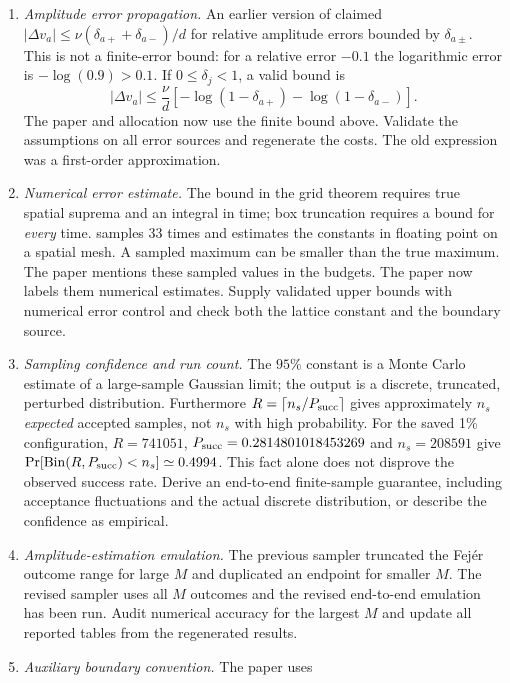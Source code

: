\documentclass[11pt,a4paper]{article}
\begin{document}
\begin{enumerate}
\item \emph{Amplitude error propagation.} An earlier version of
   claimed $|\Delta v_a|\le\nu(\delta_{a+}+\delta_{a-})/d$
  for relative amplitude errors bounded by $\delta_{a\pm}$. This is not a
  finite-error bound: for a relative error $-0.1$ the logarithmic error is
  $-\log(0.9)>0.1$. If $0\le\delta_j<1$, a valid bound is
  \[
    |\Delta v_a|\le\frac{\nu}{d}
      \left[-\log(1-\delta_{a+})-\log(1-\delta_{a-})\right].
  \]
  The paper and allocation now use the finite bound above. Validate the
  assumptions on all error sources and regenerate the costs. The old
  expression was a first-order approximation.
\item \emph{Numerical error estimate.} The bound in the grid theorem requires
  true spatial suprema and an integral in time; box truncation requires a
  bound for \emph{every} time.  samples 33
  times and estimates the constants in floating point on a spatial mesh.
  A sampled maximum can be smaller than the true maximum. The paper mentions
  these sampled values in the budgets. The paper now labels them numerical
  estimates. Supply validated upper bounds with numerical error control and
  check both the lattice constant and the boundary source.
\item \emph{Sampling confidence and run count.} The $95\%$ constant is a
  Monte Carlo estimate of a large-sample Gaussian limit; the output is a
  discrete, truncated, perturbed distribution. Furthermore
  $R=\lceil n_s/P_{\rm succ}\rceil$ gives approximately $n_s$ \emph{expected}
  accepted samples, not $n_s$ with high probability. For the saved 1\%
  configuration, $R=741051$, $P_{\rm succ}=0.2814801018453269$ and
  $n_s=208591$ give $\Pr[\operatorname{Bin}(R,P_{\rm succ})<n_s]\simeq0.4994$.
  This fact alone does not disprove the observed success rate. Derive an
  end-to-end finite-sample guarantee, including acceptance fluctuations and
  the actual discrete distribution, or describe the confidence as empirical.
\item \emph{Amplitude-estimation emulation.} The previous sampler truncated
  the Fej\'er outcome range for large $M$ and duplicated an endpoint for
  smaller $M$. The revised sampler uses all $M$ outcomes and the revised
  end-to-end emulation has been run. Audit numerical accuracy for the largest
  $M$ and update all reported tables from the regenerated results.
\item \emph{Auxiliary boundary convention.} The paper uses

\end{enumerate}
\end{document}
